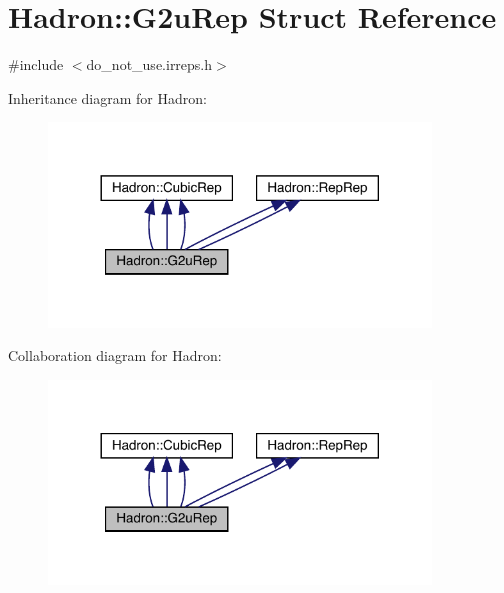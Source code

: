 \hypertarget{structHadron_1_1G2uRep}{}\section{Hadron\+:\+:G2u\+Rep Struct Reference}
\label{structHadron_1_1G2uRep}


{\ttfamily \#include $<$do\+\_\+not\+\_\+use.\+irreps.\+h$>$}



Inheritance diagram for Hadron\+:
\nopagebreak
\begin{figure}[H]
\begin{center}
\leavevmode
\includegraphics[width=288pt]{df/d1f/structHadron_1_1G2uRep__inherit__graph}
\end{center}
\end{figure}


Collaboration diagram for Hadron\+:
\nopagebreak
\begin{figure}[H]
\begin{center}
\leavevmode
\includegraphics[width=288pt]{d4/dd6/structHadron_1_1G2uRep__coll__graph}
\end{center}
\end{figure}
